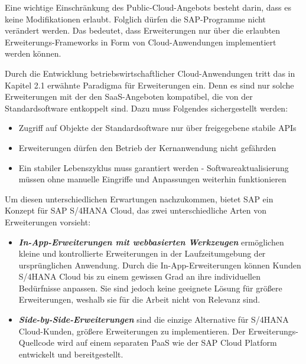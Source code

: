Eine wichtige Einschränkung des Public-Cloud-Angebots besteht darin, dass es keine Modifikationen erlaubt. Folglich dürfen die SAP-Programme nicht verändert werden. Das bedeutet, dass Erweiterungen nur über die erlaubten Erweiterungs-Frameworks in Form von Cloud-Anwendungen implementiert werden können.
\autocite{Schneider.2018}

Durch die Entwicklung betriebswirtschaftlicher Cloud-Anwendungen tritt das in Kapitel 2.1 erwähnte Paradigma für Erweiterungen ein. Denn es sind nur solche Erweiterungen mit der den \ac{SaaS}-Angeboten kompatibel, die von der Standardsoftware entkoppelt sind. Dazu muss Folgendes sichergestellt werden: 
\begin{itemize}
    \item Zugriff auf Objekte der Standardsoftware nur über freigegebene stabile \ac{API}s
    \item Erweiterungen dürfen den Betrieb der Kernanwendung nicht gefährden
    \item Ein stabiler Lebenszyklus muss garantiert werden - Softwareaktualisierung müssen ohne manuelle Eingriffe und Anpassungen weiterhin funktionieren 
    \autocite{Herzig.2018}
\end{itemize}

Um diesen unterschiedlichen Erwartungen nachzukommen, bietet SAP ein Konzept für SAP S/4HANA Cloud, das zwei unterschiedliche Arten von Erweiterungen vorsieht:
\begin{itemize}
    \item \textit{\textbf{In-App-Erweiterungen mit webbasierten Werkzeugen}} ermöglichen kleine und kontrollierte Erweiterungen in der Laufzeitumgebung der ursprünglichen Anwendung. Durch die In-App-Erweiterungen können Kunden S/4HANA Cloud bis zu einem gewissen Grad an ihre individuellen Bedürfnisse anpassen. Sie sind jedoch keine geeignete Lösung für größere Erweiterungen, weshalb sie für die Arbeit nicht von Relevanz sind.
    \item \textit{\textbf{Side-by-Side-Erweiterungen}} sind die einzige Alternative für S/4HANA Cloud-Kunden, größere Erweiterungen zu implementieren. Der Erweiterungs-Quellcode wird auf einem separaten \ac{PaaS} wie der SAP Cloud Platform entwickelt und bereitgestellt.
    \ \autocite{Herzig.2018}
\end{itemize}

